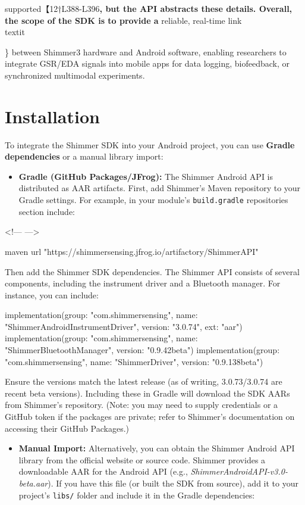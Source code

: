 supported\cite{CortisolStressIndicator2020}【12†L388-L396\textbf{,
but the API abstracts these details. Overall, the scope of the SDK is to
provide a} reliable, real-time link\\textit{\} between Shimmer3 hardware and
Android software, enabling researchers to integrate GSR/EDA signals into
mobile apps for data logging, biofeedback, or synchronized multimodal
experiments.

\section{Installation}

To integrate the Shimmer SDK into your Android project, you can use
\textbf{Gradle dependencies} or a manual library import:

\begin{itemize}
\item \textbf{Gradle (GitHub Packages/JFrog):} The Shimmer Android API is
  distributed as AAR artifacts. First, add Shimmer's Maven repository to
  your Gradle settings. For example, in your module's \texttt{build.gradle}
  repositories section include:

\end{itemize}
<!--- --->

    maven { 
        url "https://shimmersensing.jfrog.io/artifactory/ShimmerAPI" 
    }

Then add the Shimmer SDK dependencies. The Shimmer API consists of
several components, including the instrument driver and a Bluetooth
manager. For instance, you can include:

    implementation(group: "com.shimmersensing", name: "ShimmerAndroidInstrumentDriver", version: "3.0.74", ext: "aar")
    implementation(group: "com.shimmersensing", name: "ShimmerBluetoothManager", version: "0.9.42beta")
    implementation(group: "com.shimmersensing", name: "ShimmerDriver", version: "0.9.138beta")

Ensure the versions match the latest release (as of writing,
3.0.73/3.0.74 are recent beta
versions\cite{WHOStressDefinition}\cite{CortisolStressIndicator2020}).
Including these in Gradle will download the SDK AARs from Shimmer's
repository. (Note: you may need to supply credentials or a GitHub token
if the packages are private; refer to Shimmer's documentation on
accessing their GitHub Packages.)

\begin{itemize}
\item \textbf{Manual Import:} Alternatively, you can obtain the Shimmer Android
  API library from the official website or source code. Shimmer provides
  a downloadable AAR for the Android API (e.g.,
  \textit{ShimmerAndroidAPI-v3.0-beta.aar}). If you have this file (or built
  the SDK from source), add it to your project's \texttt{libs/} folder and
  include it in the Gradle dependencies:


\end{itemize}}
